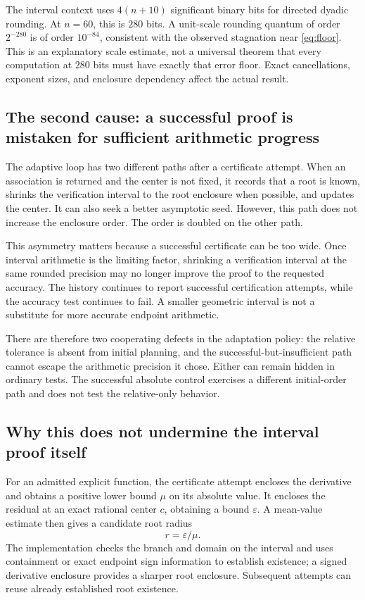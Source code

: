\documentclass[11pt,letterpaper]{article}
\begin{document}
The interval context uses $4(n+10)$ significant binary bits for directed dyadic rounding. At $n=60$, this is $280$ bits. A unit-scale rounding quantum of order $2^{-280}$ is of order $10^{-84}$, consistent with the observed stagnation near \eqref{eq:floor}. This is an explanatory scale estimate, not a universal theorem that every computation at $280$ bits must have exactly that error floor. Exact cancellations, exponent sizes, and enclosure dependency affect the actual result.

\subsection{The second cause: a successful proof is mistaken for sufficient arithmetic progress}
The adaptive loop has two different paths after a certificate attempt. When an association is returned and the center is not fixed, it records that a root is known, shrinks the verification interval to the root enclosure when possible, and updates the center. It can also seek a better asymptotic seed. However, this path does not increase the enclosure order. The order is doubled on the other path.\cite{repo-certificates}

This asymmetry matters because a successful certificate can be too wide. Once interval arithmetic is the limiting factor, shrinking a verification interval at the same rounded precision may no longer improve the proof to the requested accuracy. The history continues to report successful certification attempts, while the accuracy test continues to fail. A smaller geometric interval is not a substitute for more accurate endpoint arithmetic.

There are therefore two cooperating defects in the adaptation policy: the relative tolerance is absent from initial planning, and the successful-but-insufficient path cannot escape the arithmetic precision it chose. Either can remain hidden in ordinary tests. The successful absolute control exercises a different initial-order path and does not test the relative-only behavior.

\subsection{Why this does not undermine the interval proof itself}
For an admitted explicit function, the certificate attempt encloses the derivative and obtains a positive lower bound $\mu$ on its absolute value. It encloses the residual at an exact rational center $c$, obtaining a bound $\varepsilon$. A mean-value estimate then gives a candidate root radius
\begin{equation}
 r=\varepsilon/\mu.
\end{equation}
The implementation checks the branch and domain on the interval and uses containment or exact endpoint sign information to establish existence; a signed derivative enclosure provides a sharper root enclosure. Subsequent attempts can reuse already established root existence.\cite{repo-certificates}
\end{document}
